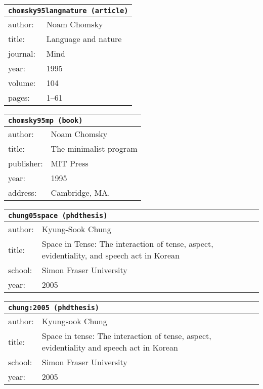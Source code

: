 \documentclass{article}
\begin{document}
\bigskip

\begin{tabular}{p{}p{}}
\multicolumn{2}{l}{\texttt{chomsky95langnature (article)}}\\
\hline
author: & Noam Chomsky\\
title: & Language and nature\\
journal: & Mind\\
year: & 1995\\
volume: & 104\\
pages: & 1--61\\
\end{tabular}

\bigskip

\begin{tabular}{p{}p{}}
\multicolumn{2}{l}{\texttt{chomsky95mp (book)}}\\
\hline
author: & Noam Chomsky\\
title: & The minimalist program\\
publisher: & MIT Press\\
year: & 1995\\
address: & Cambridge, MA.\\
\end{tabular}

\bigskip

\begin{tabular}{p{}p{}}
\multicolumn{2}{l}{\texttt{chung05space (phdthesis)}}\\
\hline
author: & Kyung-Sook Chung\\
title: & Space in Tense: The interaction of tense, aspect, evidentiality, and speech act in Korean\\
school: & Simon Fraser University\\
year: & 2005\\
\end{tabular}

\bigskip

\begin{tabular}{p{}p{}}
\multicolumn{2}{l}{\texttt{chung:2005 (phdthesis)}}\\
\hline
author: & Kyungsook Chung\\
title: & Space in tense: The interaction of tense, aspect, evidentiality and speech act in Korean\\
school: & Simon Fraser University\\
year: & 2005\\
\end{tabular}
\end{document}
